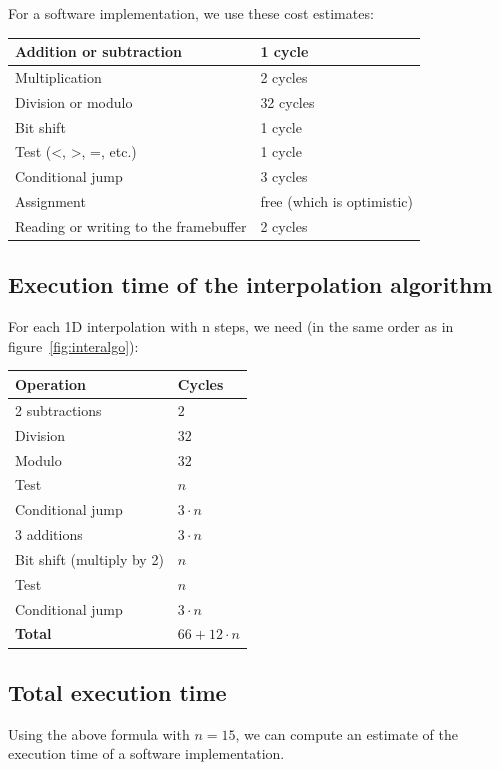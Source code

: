 \documentclass[a4paper,11pt]{kthesis}
\begin{document}
For a software implementation, we use these cost estimates:\\
\begin{tabular}{|l|l|}
\hline
Addition or subtraction & 1 cycle \\
\hline
Multiplication & 2 cycles \\
\hline
Division or modulo & 32 cycles \\
\hline
Bit shift & 1 cycle \\
\hline
Test (<, >, =, etc.) & 1 cycle \\
\hline
Conditional jump & 3 cycles \\
\hline
Assignment & free (which is optimistic) \\
\hline
Reading or writing to the framebuffer & 2 cycles \\
\hline
\end{tabular}

\subsection{Execution time of the interpolation algorithm}
For each 1D interpolation with n steps, we need (in the same order as in figure~\ref{fig:interalgo}):\\
\begin{tabular}{|l|l|}
\hline
\textbf{Operation} & \textbf{Cycles} \\
\hline
2 subtractions & $2$ \\
\hline
Division & $32$ \\
\hline
Modulo & $32$ \\
\hline
Test & $n$ \\
\hline
Conditional jump & $3 \cdot n$ \\
\hline
3 additions & $3 \cdot n$ \\
\hline
Bit shift (multiply by 2) & $n$ \\
\hline
Test & $n$ \\
\hline
Conditional jump & $3 \cdot n$ \\
\hline
\textbf{Total} & $66 + 12 \cdot n$ \\
\hline
\end{tabular}

\subsection{Total execution time}
Using the above formula with $n=15$, we can compute an estimate of the execution time of a software implementation.
\end{document}
